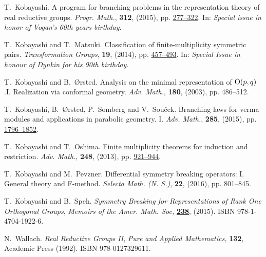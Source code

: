 \documentclass[reqno,12pt]{pja00} %
\theoremstyle{definition}
\theoremstyle{exampstyle} \newtheorem{examp}[theorem]{Theorem}
\begin{document}
\begin{thebibliography}{14}
T.~Kobayashi.
\newblock A program for branching problems in the representation theory of real
  reductive groups.
\newblock \emph{{\normalfont Progr. Math.}}, \textbf{312}, (2015), pp.
\href{http://dx.doi.org/10.1007/978-3-319-23443-4_10}{277--322}.
\newblock In: \emph{{\normalfont Special issue in honor of Vogan's 60th years
  birthday}}.

T.~Kobayashi and T.~Matsuki.
\newblock Classification of finite-multiplicity symmetric pairs.
\newblock \emph{{\normalfont Transformation Groups}}, \textbf{19}, (2014),
pp. \href{http://dx.doi.org/10.1007/s00031-014-9265-x}{457--493}.
\newblock In: \emph{{\normalfont Special Issue in honour of Dynkin
  for his 90th birthday}}.


T.~Kobayashi and B.~{\O}rsted.
\newblock Analysis on the minimal representation of\/ {${\rm
  O}(p,q)$}.{\;}{{\rm{I}}. Realization via conformal geometry}.
\newblock \emph{\normalfont Adv. Math.}, \textbf{180}, (2003), pp. 486--512.

T.~Kobayashi, B.~{\O}rsted, P.~Somberg and V.~Sou{\v{c}}ek.
\newblock Branching laws for verma modules and applications in parabolic
  geometry. {I}.
\newblock \emph{{\normalfont Adv. Math.}}, \textbf{285}, (2015), pp.
\href{http://dx.doi.org/10.1016/j.aim.2015.08.020}{1796--1852}.

T.~Kobayashi and T.~Oshima.
\newblock Finite multiplicity theorems for induction and restriction.
\newblock \emph{{\normalfont Adv. Math.}}, \textbf{248}, (2013), pp. \href{http://dx.doi.org/10.1016/j.aim.2013.07.015}{921--944}.

T.~Kobayashi and M.~Pevzner.
\newblock Differential symmetry breaking operators: I. {G}eneral theory and
  {F}-method.
\newblock \emph{{\normalfont Selecta Math. (N. S.)}}, \textbf{22}, (2016),
  pp. 801--845.

T.~Kobayashi and B.~Speh.
\newblock \emph{Symmetry {B}reaking for {R}epresentations of {R}ank {O}ne
  {O}rthogonal {G}roups}, \emph{{\normalfont Memoirs of the Amer. Math. Soc},}
  \textbf{\href{http://dx.doi.org/10.1090/memo/1126}{238}}, (2015).
\newblock ISBN 978-1-4704-1922-6.

N.~Wallach.
\newblock \emph{Real Reductive Groups II}, \emph{{\normalfont Pure and Applied
  Mathematics},} \textbf{132},
\newblock Academic {P}ress (1992).
\newblock ISBN 978-0127329611.

\end{thebibliography}
\end{document}
